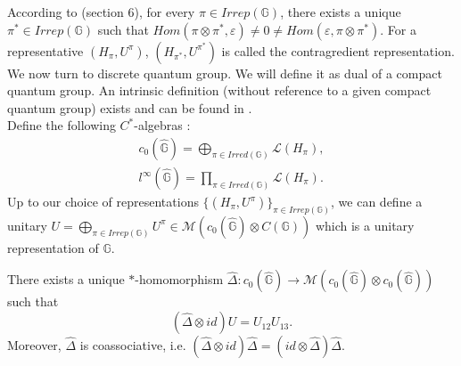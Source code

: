 According to \cite{Wo} (section $6$), for every $\pi\in Irrep(\mathbb G)$, there exists a unique $\pi^*\in Irrep(\mathbb G)$ such that $Hom(\pi\otimes \pi^*,\varepsilon)\neq 0 \neq Hom(\varepsilon,\pi\otimes \pi^*) $. For a representative $(H_\pi,U^\pi)$, $(H_{\pi^*},U^{\pi^*})$ is called the contragredient representation.\\

We now turn to discrete quantum group. We will define it as dual of a compact quantum group. An intrinsic definition (without reference to a given compact quantum group) exists and can be found in \cite{vandaele}.\\

Define the following $C^*$-algebras :
\[\begin{array}{c}
c_0(\hat{\mathbb G})= \bigoplus_{\pi\in Irred(\mathbb G)} \mathcal L(H_\pi),\\
l^\infty(\hat{\mathbb G})= \prod_{\pi\in Irred(\mathbb G)} \mathcal L(H_\pi).
\end{array}\]
Up to our choice of representations $\{(H_\pi,U^\pi)\}_{\pi\in Irrep(\mathbb G)}$, we can define a unitary $U = \bigoplus_{\pi\in Irrep(\mathbb G)} U^\pi\in \mathcal M(c_0(\hat{\mathbb G}) \otimes C(\mathbb G))$ which is a unitary representation of $\mathbb G$. 

\begin{prop} There exists a unique $*$-homomorphism $\hat \Delta : c_0(\hat{\mathbb G}) \rightarrow \mathcal M(c_0(\hat{\mathbb G})\otimes c_0(\hat{\mathbb G}))$ such that \[(\hat\Delta\otimes id ) U = U_{12}U_{13}.\]
Moreover, $\hat\Delta$ is coassociative, i.e. $(\hat\Delta \otimes id) \hat\Delta = (id\otimes \hat\Delta) \hat\Delta$.
\end{prop}

